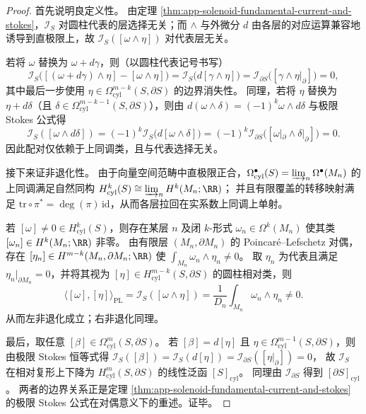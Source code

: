 \begin{proof}
首先说明良定义性。
由定理 \ref{thm:app-solenoid-fundamental-current-and-stokes}，\(\mathcal I_S\) 对圆柱代表的层选择无关；而 \(\wedge\) 与外微分 \(d\) 由各层的对应运算兼容地诱导到直极限上，故 \(\mathcal I_S([\omega\wedge\eta])\) 对代表层无关。
\par
若将 \(\omega\) 替换为 \(\omega+d\gamma\)，则（以圆柱代表记号书写）
\[
\mathcal I_S\bigl([(\omega+d\gamma)\wedge\eta]-[\omega\wedge\eta]\bigr)
=\mathcal I_S\bigl(d[\gamma\wedge\eta]\bigr)
=\mathcal I_{\partial S}\bigl([\gamma\wedge\eta|_{\partial}]\bigr)=0,
\]
其中最后一步使用 \(\eta\in\Omega^{m-k}_{\mathrm{cyl}}(S,\partial S)\) 的边界消失性。
同理，若将 \(\eta\) 替换为 \(\eta+d\delta\)（且 \(\delta\in\Omega^{m-k-1}_{\mathrm{cyl}}(S,\partial S)\)），则由 \(d(\omega\wedge\delta)=(-1)^k\omega\wedge d\delta\) 与极限 Stokes 公式得
\[
\mathcal I_S([\omega\wedge d\delta])
=(-1)^k\mathcal I_S\bigl(d[\omega\wedge\delta]\bigr)
=(-1)^k\mathcal I_{\partial S}\bigl([\omega|_{\partial}\wedge\delta|_{\partial}]\bigr)=0.
\]
因此配对仅依赖于上同调类，且与代表选择无关。
\par
接下来证非退化性。
由于向量空间范畴中直极限正合，\(\Omega^\bullet_{\mathrm{cyl}}(S)=\varinjlim_n\Omega^\bullet(M_n)\) 的上同调满足自然同构
\(
H^k_{\mathrm{cyl}}(S)\cong \varinjlim_n H^k(M_n;\RR)
\)；
并且有限覆盖的转移映射满足 \(\mathrm{tr}\circ \pi^\ast=\deg(\pi)\,\mathrm{id}\)，从而各层拉回在实系数上同调上单射。
\par
若 \([\omega]\neq 0\in H^k_{\mathrm{cyl}}(S)\)，则存在某层 \(n\) 及闭 \(k\)-形式 \(\omega_n\in\Omega^k(M_n)\) 使其类 \([\omega_n]\in H^k(M_n;\RR)\) 非零。
由有限层 \((M_n,\partial M_n)\) 的 Poincar\'e--Lefschetz 对偶，存在 \([\eta_n]\in H^{m-k}(M_n,\partial M_n;\RR)\) 使
\(
\int_{M_n}\omega_n\wedge\eta_n\neq 0
\)。
取 \(\eta_n\) 为代表且满足 \(\eta_n|_{\partial M_n}=0\)，并将其视为 \([\eta]\in H^{m-k}_{\mathrm{cyl}}(S,\partial S)\) 的圆柱相对类，则
\[
\langle[\omega],[\eta]\rangle_{\mathrm{PL}}
=\mathcal I_S([\omega\wedge\eta])
=\frac{1}{D_n}\int_{M_n}\omega_n\wedge\eta_n\neq 0.
\]
从而左非退化成立；右非退化同理。
\par
最后，取任意 \([\beta]\in\Omega^m_{\mathrm{cyl}}(S,\partial S)\)。
若 \([\beta]=d[\eta]\) 且 \(\eta\in\Omega^{m-1}_{\mathrm{cyl}}(S,\partial S)\)，则由极限 Stokes 恒等式得
\(
\mathcal I_S([\beta])=\mathcal I_S(d[\eta])=\mathcal I_{\partial S}([\eta|_{\partial}])=0
\)，
故 \(\mathcal I_S\) 在相对复形上下降为 \(H^m_{\mathrm{cyl}}(S,\partial S)\) 的线性泛函 \( [S]_{\mathrm{cyl}}\)。
同理由 \(\mathcal I_{\partial S}\) 得到 \( [\partial S]_{\mathrm{cyl}}\)。
两者的边界关系正是定理 \ref{thm:app-solenoid-fundamental-current-and-stokes} 的极限 Stokes 公式在对偶意义下的重述。证毕。
\end{proof}

\endinput
